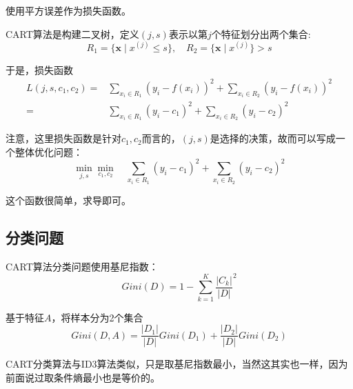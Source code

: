 \documentclass{article}
\begin{document}
        使用平方误差作为损失函数。
        
        CART算法是构建二叉树，定义$(j,s)$表示以第$j$个特征划分出两个集合:
        \[R_1=\{\boldsymbol{x}\mid x^{(j)}\le s\},\quad R_2=\{\boldsymbol{x}\mid x^{(j)}\}> s\]

        于是，损失函数
        \begin{align*}
             L(j,s,c_1,c_2)= & \sum_{x_i\in R_1}(y_i-f(x_i))^2+\sum_{x_i \in R_2}(y_i-f(x_i))^2\\
                            =& \sum_{x_i\in R_1}(y_i-c_1)^2+\sum_{x_i \in R_2}(y_i-c_2)^2
        \end{align*}

        注意，这里损失函数是针对$c_1,c_2$而言的，$(j,s)$是选择的决策，故而可以写成一个整体优化问题：
        \[\min_{j,s} \min_{c_1,c_2}\quad\sum_{x_i\in R_1}(y_i-c_1)^2+\sum_{x_i \in R_2}(y_i-c_2)^2\]

        这个函数很简单，求导即可。

        \subsection{分类问题}
        CART算法分类问题使用基尼指数：
        \[Gini(D)=1-\sum_{k=1}^{K}\frac{\left|C_k\right|}{\left|D\right|}^2\]

        基于特征$A$，将样本分为2个集合
        \[Gini(D,A)=\frac{\left|D_1\right|}{\left|D\right|}Gini(D_1)+\frac{\left|D_2\right|}{\left|D\right|}Gini(D_2)\]
       
        CART分类算法与ID3算法类似，只是取基尼指数最小，当然这其实也一样，因为前面说过取条件熵最小也是等价的。
    
\end{document}
